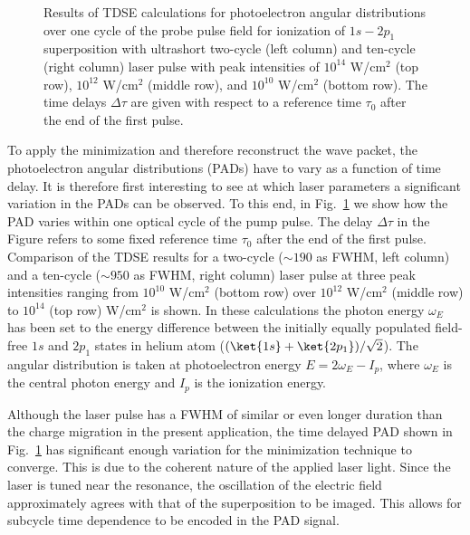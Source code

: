 \begin{figure}[!ht]
\caption{
Results of TDSE calculations for photoelectron angular distributions over one cycle of the probe pulse field for ionization of $1s - 2p_1$ superposition with ultrashort two-cycle (left column) and ten-cycle (right column) laser pulse with peak intensities of $10^{14}$ W/cm$^2$ (top row), $10^{12}$ W/cm$^2$ (middle row), and $10^{10}$ W/cm$^2$ (bottom row). The time delays $\Delta \tau$ are given with respect to a reference time $\tau_0$ after the end of the first pulse.
} 
  \label{fig:pad_vs_time}
\end{figure}

To apply the minimization and therefore reconstruct the wave packet, the photoelectron angular distributions (PADs) have to vary as a function of time delay. It is therefore first interesting to see at which laser parameters a significant variation in the PADs can be observed. To this end,
in Fig.~\ref{fig:pad_vs_time} we show how the PAD varies within one optical cycle of the pump pulse.
The delay $\Delta \tau$ in the Figure refers to some fixed reference time $\tau_0$ after the end of the first pulse. Comparison of the TDSE results for a two-cycle ($\sim190$ as FWHM, left column) and a ten-cycle ($\sim950$ as FWHM, right column) laser pulse at three peak intensities ranging from $10^{10}$ W/cm$^2$ (bottom row) over $10^{12}$ W/cm$^2$ (middle row) to $10^{14}$ (top row) W/cm$^2$ is shown. In these calculations the photon energy $\omega_E$ has been set to the energy difference between the initially equally populated field-free $1s$ and $2p_1$ states in helium atom ($(\ket{1s}+\ket{2p_1})/\sqrt{2}$). The angular distribution is taken at photoelectron energy $E = 2\omega_E - I_p$, where $\omega_E$ is the central photon energy and $I_p$ is the ionization energy. 

Although the laser pulse has a FWHM of similar or even longer duration than the charge migration in the present application, the time delayed PAD shown in Fig.~\ref{fig:pad_vs_time} has significant enough variation for the minimization technique to converge. This is due to the coherent nature of the applied laser light. Since the laser is tuned near the resonance, the oscillation of the electric field approximately agrees with that of the superposition to be imaged. This allows for subcycle time dependence to be encoded in the PAD signal.

